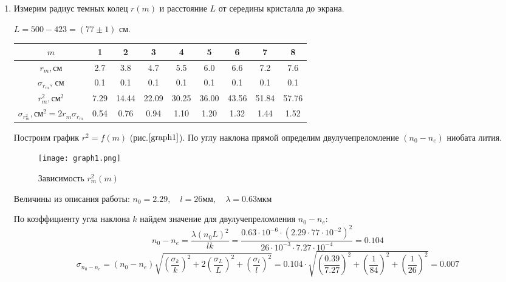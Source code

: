 \documentclass[a4paper,12pt]{article}
\begin{document}
\begin{enumerate}

    \item Измерим радиус темных колец $r(m)$ и расстояние $L$ от середины кристалла до экрана.

    $L=500-423=(77\pm1)$ см.
    
    \begin{table}[h!]
    \centering
    \begin{tabular}{||c|c|c|c|c|c|c|c|c||}
    \hline
        $m$ & 1 & 2 & 3 & 4 & 5 & 6 & 7 & 8 \\
        \hline
        $r_m,$см & 2.7 & 3.8 & 4.7 & 5.5 & 6.0 & 6.6 & 7.2 & 7.6 \\
        \hline
        $\sigma_{r_m}$, см & 0.1 & 0.1 & 0.1 & 0.1 & 0.1 & 0.1 & 0.1 & 0.1 \\
        \hline
        $r_m^2,\text{см}^2$ & 7.29 & 14.44 & 22.09 & 30.25 & 36.00 & 43.56 & 51.84 & 57.76 \\
        \hline 
        $\sigma_{r_m^2}, \text{см}^2=2 r_m\sigma_{r_m}$ & 0.54 & 0.76 & 0.94 & 1.10 & 1.20 & 1.32 & 1.44 & 1.52 \\
    \hline
    \end{tabular}
    \end{table}

    Построим график $r^2=f(m)$ (рис.$\ref{graph1}$). По углу наклона прямой определим двулучепреломление $(n_0-n_e)$ ниобата лития.

    \begin{figure}[h]
    \centering
    \texttt{[image: graph1.png]}
    \caption{Зависимость $r_m^2(m)$}
    \label{graph1}
    \end{figure}
    
    Величины из описания работы: $n_0=2.29,\quad l=26\text{мм}, \quad \lambda=0.63\text{мкм}$

    По коэффициенту угла наклона $k$ найдем значение для двулучепреломления $n_0 - n_e$:
    $$
    n_0-n_e=\frac{\lambda (n_0L)^2}{lk}=\frac{0.63\cdot 10^{-6}\cdot(2.29\cdot77\cdot 10^{-2})^2}{26\cdot 10^{-3}\cdot 7.27\cdot 10^{-4}}=0.104
    $$
    $$
    \sigma_{n_0-n_e} = (n_0-n_e)\sqrt{\left(\frac{\sigma_k}{k}\right)^2 + 2\left(\frac{\sigma_L}{L}\right)^2 + \left(\frac{\sigma_l}{l}\right)^2}=0.104\cdot\sqrt{\left(\frac{0.39}{7.27}\right)^2+\left(\frac{1}{84}\right)^2+\left(\frac{1}{26}\right)^2}=0.007
    $$
    
    \begin{center}
    \end{center}


\end{enumerate}
\end{document}
